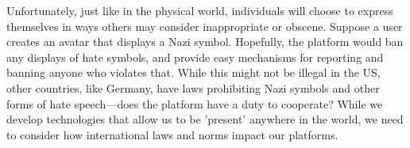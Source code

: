 Unfortunately, just like in the physical world, individuals will choose to express themselves in ways others may consider inappropriate or obscene. Suppose a user creates an avatar that displays a Nazi symbol. Hopefully, the platform would ban any displays of hate symbols, and provide easy mechanisms for reporting and banning anyone who violates that. While this might not be illegal in the US, other countries, like Germany, have laws prohibiting Nazi symbols and other forms of hate speech---does the platform have a duty to cooperate? While we develop technologies that allow us to be 'present' anywhere in the world, we need to consider how international laws and norms impact our platforms.



